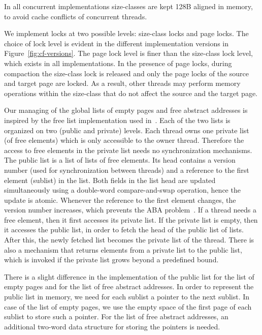 \documentclass{amsart}
\begin{document}
In all concurrent implementations size-classes are kept 128B aligned
in memory, to avoid cache conflicts of concurrent threads.

We implement locks at two possible levels: size-class locks and page
locks.  The choice of lock level is evident in the different
implementation versions in Figure~\ref{fig:cf-versions}.  The page
lock level is finer than the size-class lock level, which exists in
all implementations.  In the presence of page locks, during compaction
the size-class lock is released and only the page locks of the source
and target page are locked.  As a result, other threads may perform
memory operations within the size-class that do not affect the source
and the target page.

Our managing of the global lists of empty pages and free abstract addresses is
inspired by the free list implementation used in~\cite{Hud2}.  Each of the two
lists is organized on two (public and private) levels.  Each thread owns one
private list (of free elements) which is only accessible to the owner thread.
Therefore the access to free elements in the private list needs no
synchronization mechanisms.  The public list is a list of lists of free
elements.  Its head contains a version number (used for synchronization between
threads) and a reference to the first element (sublist) in the list.  Both
fields in the list head are updated simultaneously using a double-word
compare-and-swap operation, hence the update is atomic.  Whenever the reference
to the first element changes, the version number increases, which prevents the
ABA problem~\cite{Herlihy08}.  If a thread needs a free element, then it first
accesses its private list.  If the private list is empty, then it accesses the
public list, in order to fetch the head of the public list of lists.  After
this, the newly fetched list becomes the private list of the thread.  There is
also a mechanism that returns elements from a private list to the public list,
which is invoked if the private list grows beyond a predefined bound.

There is a slight difference in the implementation of the public list
for the list of empty pages and for the list of free abstract
addresses.  In order to represent the public list in memory, we need
for each sublist a pointer to the next sublist.  In case of the list
of empty pages, we use the empty space of the first page of each
sublist to store such a pointer.  For the list of free abstract
addresses, an additional two-word data structure for storing the
pointers is needed.
\end{document}
